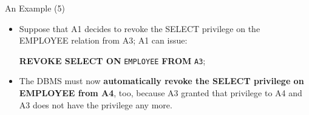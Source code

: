 \begin{frame}{An Example (5)}
    \Large %
    
    \begin{itemize}
        \vspace{-1.5cm} %
        
        \item Suppose that A1 decides to revoke the SELECT privilege on the EMPLOYEE relation from A3; A1 can issue:
        
        \vspace{0.2cm}
        {
            \normalsize \color{red!70!black}
            \textbf{REVOKE SELECT ON} \texttt{EMPLOYEE} \textbf{FROM} \texttt{A3};
        }
        \vspace{0.2cm}
        
        \item The DBMS must now \textbf{automatically revoke the SELECT privilege on EMPLOYEE from A4}, too, because A3 granted that privilege to A4 and A3 does not have the privilege any more.
        
    \end{itemize}
\end{frame}

